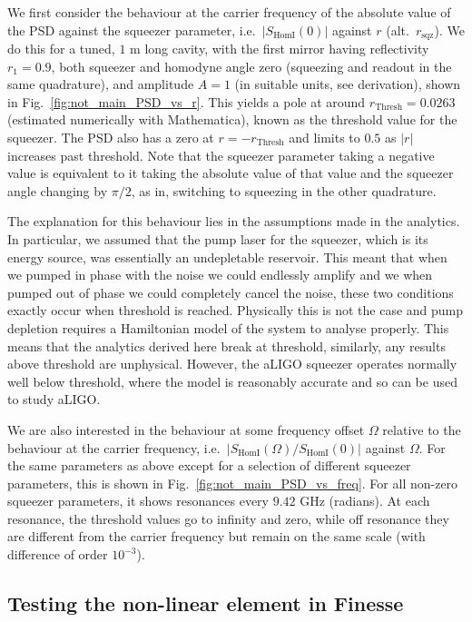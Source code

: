 \documentclass[aps,pra,superscriptaddress,reprint,nofootinbib]{revtex4-1}
\newcommand{\abs}[1]{\left\lvert #1 \right\rvert}
\begin{document}
We first consider the behaviour at the carrier frequency of the absolute value of the PSD against the squeezer parameter, i.e.\ $\abs{S_{\mathrm{HomI}}(0)}$ against $r$ (alt.\ $r_\mathrm{sqz}$). We do this for a tuned, $1$ m long cavity, with the first mirror having reflectivity $r_1 = 0.9$, both squeezer and homodyne angle zero (squeezing and readout in the same quadrature), and amplitude $A = 1$ (in suitable units, see derivation), shown in Fig.~\ref{fig:not_main_PSD_vs_r}. This yields a pole at around $r_\mathrm{Thresh} = 0.0263$ (estimated numerically with Mathematica), known as the threshold value for the squeezer. The PSD also has a zero at $r = -r_\mathrm{Thresh}$ and limits to $0.5$ as $\abs{r}$ increases past threshold. Note that the squeezer parameter taking a negative value is equivalent to it taking the absolute value of that value and the squeezer angle changing by $\pi/2$, as in, switching to squeezing in the other quadrature.


The explanation for this behaviour lies in the assumptions made in the analytics. In particular, we assumed that the pump laser for the squeezer, which is its energy source, was essentially an undepletable reservoir. This meant that when we pumped in phase with the noise we could endlessly amplify and we when pumped out of phase we could completely cancel the noise, these two conditions exactly occur when threshold is reached. Physically this is not the case and pump depletion requires a Hamiltonian model of the system to analyse properly. This means that the analytics derived here break at threshold, similarly, any results above threshold are unphysical.
However, the aLIGO squeezer operates normally well below threshold, where the model is reasonably accurate and so can be used to study aLIGO.


We are also interested in the behaviour at some frequency offset $\Omega$ relative to the behaviour at the carrier frequency, i.e.\ $\abs{S_{\mathrm{HomI}}(\Omega)/S_{\mathrm{HomI}}(0)}$ against $\Omega$. For the same parameters as above except for a selection of different squeezer parameters, this is shown in Fig.~\ref{fig:not_main_PSD_vs_freq}. For all non-zero squeezer parameters, it shows resonances every $9.42$ GHz (radians). At each resonance, the threshold values go to infinity and zero, while off resonance they are different from the carrier frequency but remain on the same scale (with difference of order $10^{-3}$).


\subsection{Testing the non-linear element in Finesse}
\end{document}
